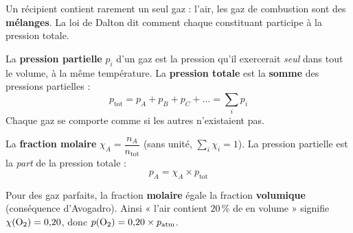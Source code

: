 \documentclass[11pt,a4paper]{article}
\begin{document}

Un récipient contient rarement un seul gaz : l'air, les gaz de combustion sont des \textbf{mélanges}.
La loi de Dalton dit comment chaque constituant participe à la pression totale.

\begin{cle}
La \textbf{pression partielle} $p_i$ d'un gaz est la pression qu'il exercerait \emph{seul} dans tout le
volume, à la même température. La \textbf{pression totale} est la \textbf{somme} des pressions
partielles :
\[ \boxed{\,p_{\text{tot}}=p_A+p_B+p_C+\dots=\sum_i p_i\,} \]
Chaque gaz se comporte comme si les autres n'existaient pas.
\end{cle}

\begin{cle}
La \textbf{fraction molaire} $\chi_A=\dfrac{n_A}{n_{\text{tot}}}$ (sans unité, $\sum_i\chi_i=1$). La
pression partielle est la \emph{part} de la pression totale :
\[ \boxed{\,p_A=\chi_A\times p_{\text{tot}}\,} \]
\end{cle}

\begin{center}
\end{center}

\begin{cle}[Fraction molaire $=$ fraction volumique (gaz parfaits)]
Pour des gaz parfaits, la fraction \textbf{molaire} égale la fraction \textbf{volumique} (conséquence
d'Avogadro). Ainsi « l'air contient $20\,\%$ de  en volume » signifie $\chi(\ce{O2})=0{,}20$,
donc $p(\ce{O2})=0{,}20\times p_{\text{atm}}$.
\end{cle}
\end{document}
